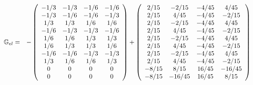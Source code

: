 \begin{eqnarray}
{\mathbb{G}}_{el} 
&=&
-
\left(
\begin{array}{cccc}
-1/3 & -1/3  & -1/6 &  -1/6  \\
-1/3 & -1/6  & -1/6 &  -1/3  \\
1/3  & 1/3   & 1/6  &   1/6 \\
-1/6 & -1/3  & -1/3 &  -1/6  \\
1/6 & 1/6    & 1/3  &   1/3 \\
1/6 & 1/3    & 1/3  &   1/6 \\
-1/6 & -1/6   & -1/3 &  -1/3  \\
1/3 & 1/6    & 1/6  &   1/3 \\
0 & 0 & 0 & 0   \\
0 & 0 & 0 & 0     
\end{array}
\right)
+
\left(
\begin{array}{cccc}
2/15 & -2/15   & -4/45   & 4/45 \\
2/15 & 4/45   & -4/45   & -2/15  \\
2/15 & -2/15   & -4/45   & 4/45  \\
2/15 & 4/45   & -4/45   & -2/15  \\
2/15 & -2/15   & -4/45   & 4/45  \\
2/15 & 4/45   & -4/45   & -2/15  \\
2/15 & -2/15   & -4/45   & 4/45  \\
2/15 & 4/45   & -4/45   & -2/15  \\
-8/15 & 8/15  & 16/45   & -16/45  \\
-8/15 & -16/45 & 16/45   & 8/15  
\end{array}
\right) 
\end{eqnarray}

